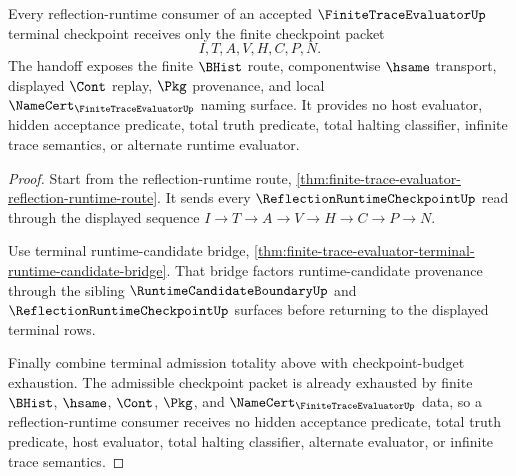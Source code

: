 \begin{theorem}
\label{thm:finite-trace-evaluator-terminal-reflection-handoff}
Every reflection-runtime consumer of an accepted $\FiniteTraceEvaluatorUp$
terminal checkpoint receives only the finite checkpoint packet
$$
I,T,A,V,H,C,P,N.
$$
The handoff exposes the finite $\BHist$ route, componentwise $\hsame$
transport, displayed $\Cont$ replay, $\Pkg$ provenance, and local
$\NameCert_{\FiniteTraceEvaluatorUp}$ naming surface. It provides no host
evaluator, hidden acceptance predicate, total truth predicate, total halting
classifier, infinite trace semantics, or alternate runtime evaluator.
\end{theorem}
\begin{proof}
Start from the reflection-runtime route,
\autoref{thm:finite-trace-evaluator-reflection-runtime-route}. It sends every
$\ReflectionRuntimeCheckpointUp$ read through the displayed sequence
$I \to T \to A \to V \to H \to C \to P \to N$.

Use terminal runtime-candidate bridge,
\autoref{thm:finite-trace-evaluator-terminal-runtime-candidate-bridge}. That
bridge factors runtime-candidate provenance through the sibling
$\RuntimeCandidateBoundaryUp$ and $\ReflectionRuntimeCheckpointUp$ surfaces
before returning to the displayed terminal rows.

Finally combine terminal admission totality above with checkpoint-budget
exhaustion. The admissible checkpoint packet is already exhausted by finite
$\BHist$, $\hsame$, $\Cont$, $\Pkg$, and
$\NameCert_{\FiniteTraceEvaluatorUp}$ data, so a reflection-runtime consumer
receives no hidden acceptance predicate, total truth predicate, host
evaluator, total halting classifier, alternate evaluator, or infinite trace
semantics.
\end{proof}
